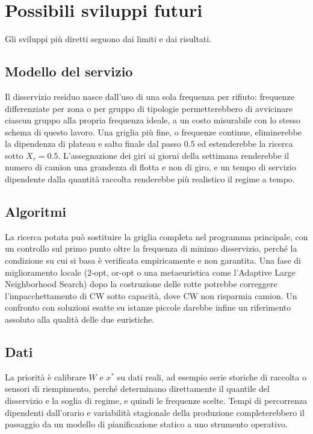 \section*{Possibili sviluppi futuri}

Gli sviluppi più diretti seguono dai limiti e dai risultati.

\subsection*{Modello del servizio}

Il disservizio residuo nasce dall'uso di una sola frequenza per rifiuto: frequenze differenziate per zona o per gruppo di tipologie permetterebbero di avvicinare ciascun gruppo alla propria frequenza ideale, a un costo misurabile con lo stesso schema di questo lavoro. Una griglia più fine, o frequenze continue, eliminerebbe la dipendenza di plateau e salto finale dal passo $0.5$ ed estenderebbe la ricerca sotto $X_r=0.5$. L'assegnazione dei giri ai giorni della settimana renderebbe il numero di camion una grandezza di flotta e non di giro, e un tempo di servizio dipendente dalla quantità raccolta renderebbe più realistico il regime a tempo.

\subsection*{Algoritmi}

La ricerca potata può sostituire la griglia completa nel programma principale, con un controllo sul primo punto oltre la frequenza di minimo disservizio, perché la condizione su cui si basa è verificata empiricamente e non garantita. Una fase di miglioramento locale (2-opt, or-opt o una metaeuristica come l'Adaptive Large Neighborhood Search) dopo la costruzione delle rotte potrebbe correggere l'impacchettamento di CW sotto capacità, dove CW non risparmia camion. Un confronto con soluzioni esatte su istanze piccole darebbe infine un riferimento assoluto alla qualità delle due euristiche.

\subsection*{Dati}

La priorità è calibrare $W$ e $x^*$ su dati reali, ad esempio serie storiche di raccolta o sensori di riempimento, perché determinano direttamente il quantile del disservizio e la soglia di regime, e quindi le frequenze scelte. Tempi di percorrenza dipendenti dall'orario e variabilità stagionale della produzione completerebbero il passaggio da un modello di pianificazione statico a uno strumento operativo.
